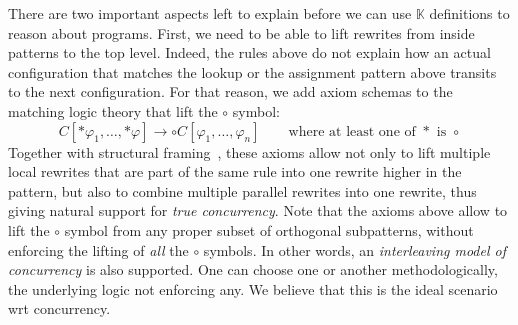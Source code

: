 \documentclass[UTF8,11pt]{article}
\theoremstyle{plain}
\theoremstyle{definition}
\theoremstyle{remark}
\newcommand{\K}{\mbox{$\mathbb{K}$}\xspace}
\begin{document}
There are two important aspects left to explain before we can use \K definitions to
reason about programs.
First, we need to be able to lift rewrites from inside patterns to the
top level.
Indeed, the rules above do not explain how an actual configuration
that matches the lookup or the assignment pattern above transits to
the next configuration.
For that reason, we add axiom schemas to the matching logic theory
that lift the $\circ$ symbol:
$$
C[* \varphi_1,\dots, * \varphi] \to \circ C[\varphi_1,\dots,\varphi_n]
\qquad
\text{where at least one of $*$ is $\circ$}
$$
Together with structural framing~\cite{rosu-2017-lmcs},
these axioms allow not only to lift multiple local rewrites
that are part of the same rule into one rewrite higher in the
pattern, but also to combine multiple parallel rewrites into
one rewrite, thus giving natural support for \emph{true concurrency}.
Note that the axioms above allow to lift the $\circ$ symbol from
any proper subset of orthogonal subpatterns, without enforcing
the lifting of \emph{all} the $\circ$ symbols.
In other words, an \emph{interleaving model of concurrency}
is also supported.
One can choose one or another methodologically, the underlying
logic not enforcing any.
We believe that this is the ideal scenario wrt concurrency.
\end{document}

